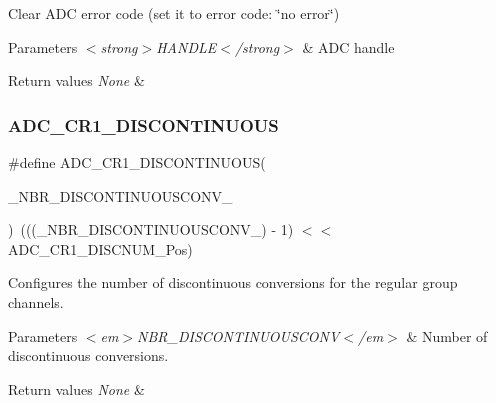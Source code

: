 Clear A\+DC error code (set it to error code\+: \char`\"{}no error\char`\"{}) 


\begin{DoxyParams}{Parameters}
{\em $<$strong$>$\+H\+A\+N\+D\+L\+E$<$/strong$>$} & A\+DC handle \\
\hline
\end{DoxyParams}

\begin{DoxyRetVals}{Return values}
{\em None} & \\
\hline
\end{DoxyRetVals}
\mbox{\label{group___a_d_c___private___macros_ga5b8b6fe1d24684616ccf43b8e5e0ef23}} 
\subsubsection{\texorpdfstring{ADC\_CR1\_DISCONTINUOUS}{ADC\_CR1\_DISCONTINUOUS}}
{\footnotesize\ttfamily \#define A\+D\+C\+\_\+\+C\+R1\+\_\+\+D\+I\+S\+C\+O\+N\+T\+I\+N\+U\+O\+US(\begin{DoxyParamCaption}\item[{}]{\+\_\+\+N\+B\+R\+\_\+\+D\+I\+S\+C\+O\+N\+T\+I\+N\+U\+O\+U\+S\+C\+O\+N\+V\+\_\+ }\end{DoxyParamCaption})~(((\+\_\+\+N\+B\+R\+\_\+\+D\+I\+S\+C\+O\+N\+T\+I\+N\+U\+O\+U\+S\+C\+O\+N\+V\+\_\+) -\/ 1) $<$$<$ A\+D\+C\+\_\+\+C\+R1\+\_\+\+D\+I\+S\+C\+N\+U\+M\+\_\+\+Pos)}



Configures the number of discontinuous conversions for the regular group channels. 


\begin{DoxyParams}{Parameters}
{\em $<$em$>$\+N\+B\+R\+\_\+\+D\+I\+S\+C\+O\+N\+T\+I\+N\+U\+O\+U\+S\+C\+O\+N\+V$<$/em$>$} & Number of discontinuous conversions. \\
\hline
\end{DoxyParams}

\begin{DoxyRetVals}{Return values}
{\em None} & \\
\hline
\end{DoxyRetVals}
\mbox{\label{group___a_d_c___private___macros_gad46aba92287da828c570fab3599e38c2}} 
